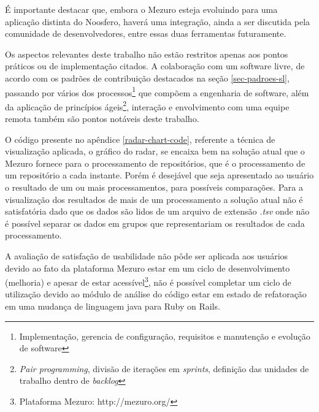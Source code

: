 É importante destacar que, embora o Mezuro esteja evoluindo para uma aplicação distinta do Noosfero, haverá uma integração, ainda a ser discutida pela comunidade de desenvolvedores, entre essas duas ferramentas futuramente.

Os aspectos relevantes deste trabalho não estão restritos apenas aos  pontos práticos ou de implementação citados. A colaboração com um software livre, de acordo com os padrões de contribuição destacados na seção \ref{sec-padroes-sl}, passando por vários dos processos\footnote{Implementação, gerencia de configuração, requisitos e manutenção e evolução de software} que compõem a engenharia de software, além da aplicação de princípios ágeis\footnote{\textit{Pair programming}, divisão de iterações em \textit{sprints}, definição das unidades de trabalho dentro de \textit{backlog}}, interação e envolvimento com uma equipe remota também são pontos notáveis deste trabalho.

O código presente no apêndice \ref{radar-chart-code}, referente a técnica de visualização aplicada, o gráfico do radar, se encaixa bem na solução atual que o Mezuro fornece para o processamento de repositórios, que é o processamento de um repositório a cada instante. Porém é desejável que seja apresentado ao usuário o resultado de um ou mais processamentos, para possíveis comparações. Para a visualização dos resultados de mais de um processamento a solução atual não é satisfatória dado que os dados são lidos de um arquivo de extensão \textit{.tsv} onde não é possível separar os dados em grupos que representariam os resultados de cada processamento.

A avaliação de satisfação de usabilidade não pôde ser aplicada aos usuários devido ao fato da plataforma Mezuro estar em um ciclo de desenvolvimento (melhoria) e apesar de estar acessível\footnote{Plataforma Mezuro: http://mezuro.org/}, não é possível completar um ciclo de utilização devido ao módulo de análise do código estar em estado de refatoração em uma mudança de linguagem java para Ruby on Rails.

